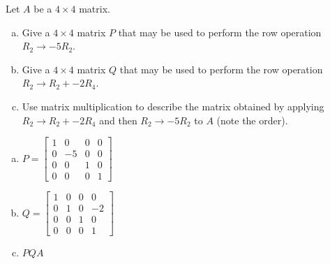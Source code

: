 
\begin{exerciseStatement}


Let \(A\) be a \(4 \times 4\) matrix.


\begin{enumerate}[(a)]
\item Give a \(4 \times 4\) matrix \(P\) that may be used to perform the row operation \( R_2 \to -5R_2 \).
\item Give a \(4 \times 4\) matrix \(Q\) that may be used to perform the row operation \( R_2 \to R_2 + -2R_4 \).
\item Use matrix multiplication to describe the matrix obtained by applying \( R_2 \to R_2 + -2R_4 \) and then \( R_2 \to -5R_2 \) to \(A\) (note the order). 
\end{enumerate}
    
\end{exerciseStatement}
    
\begin{exerciseAnswer} 

\begin{enumerate}[(a)]
\item \(P= \left[\begin{array}{cccc}
1 & 0 & 0 & 0 \\
0 & -5 & 0 & 0 \\
0 & 0 & 1 & 0 \\
0 & 0 & 0 & 1
\end{array}\right] \)
\item \(Q= \left[\begin{array}{cccc}
1 & 0 & 0 & 0 \\
0 & 1 & 0 & -2 \\
0 & 0 & 1 & 0 \\
0 & 0 & 0 & 1
\end{array}\right] \)
\item \(PQA\)
\end{enumerate}
    
\end{exerciseAnswer}
    
